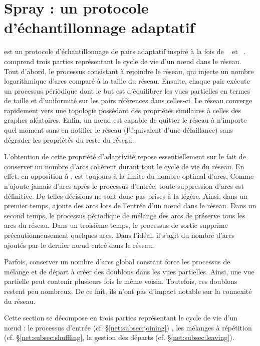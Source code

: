 
\section{Spray : un protocole d'échantillonnage adaptatif}
\label{net:sec:spray}

\SPRAY est un protocole d'échantillonnage de pairs adaptatif inspiré à
la fois de \SCAMP~\cite{ganesh2003peer} et
\CYCLON~\cite{voulgaris2005cyclon}. \SPRAY comprend trois parties représentant
le cycle de vie d'un nœud dans le réseau. Tout d'abord, le processus consistant
à rejoindre le réseau, qui injecte un nombre logarithmique d'arcs comparé à la
taille du réseau.  Ensuite, chaque pair exécute un processus périodique dont le
but est d'équilibrer les vues partielles en termes de taille et d'uniformité sur
les pairs références dans celles-ci. Le réseau converge rapidement vers une
topologie possédant des propriétés similaires à celles des graphes
aléatoires. Enfin, un nœud est capable de quitter le réseau à n'importe quel
moment sans en notifier le réseau (l'équivalent d'une défaillance) sans dégrader
les propriétés du reste du réseau.

L'obtention de cette propriété d'adaptivité repose essentiellement sur le fait
de conserver un nombre d'arcs cohérent durant tout le cycle de vie du réseau.
En effet, en opposition à \CYCLON, \SPRAY est toujours à la limite du nombre
optimal d'arcs. Comme \SPRAY n'ajoute jamais d'arcs après le processus d'entrée,
toute suppression d'arcs est définitive. De telles décisions ne sont donc pas
prises à la légère. Ainsi, dans un premier temps, \SPRAY ajoute des arcs lors de
l'entrée d'un nœud dans le réseau. Dans un second temps, le processus périodique
de mélange des arcs de \SPRAY préserve tous les arcs du réseau.  Dans un
troisième temps, le processus de sortie supprime précautionneusement quelques
arcs. Dans l'idéal, il s'agit du nombre d'arcs ajoutés par le dernier nœud entré
dans le réseau.

Parfois, conserver un nombre d'arcs global constant force les processus de
mélange et de départ à créer des doublons dans les vues partielles. Ainsi, une
vue partielle peut contenir plusieurs fois le même voisin. Toutefois, ces
doublons restent peu nombreux. De ce fait, ils n'ont pas d'impact notable sur la
connexité du réseau.

Cette section se décompose en trois parties représentant le cycle de vie d'un
nœud : le processus d'entrée (cf. §\ref{net:subsec:joining}) , les mélanges à
répétition (cf. §\ref{net:subsec:shuffling}, la gestion des départs
(cf. §\ref{net:subsec:leaving}).


